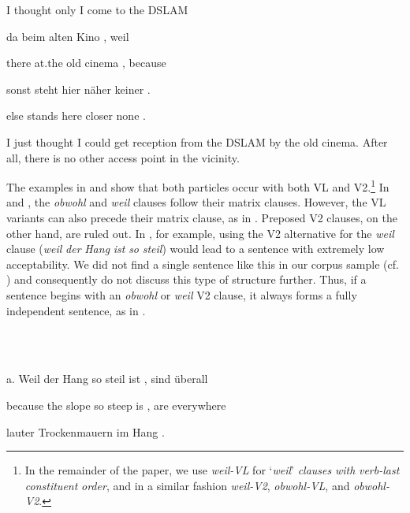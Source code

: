 I  thought  only  I  come    to  the  DSLAM



da  beim    alten    Kino    ,  weil



there  at.the    old    cinema  ,  because



sonst  steht    hier    näher    keiner  .



else  stands  here    closer  none    .



I just thought I could get reception from the DSLAM by the old cin\-ema. After all, there is no other access point in the vicinity.



The examples in  and  show that both particles occur with both VL and V2.\footnote{In the remainder of the paper, we use \textit{weil-VL} for ‘\textit{weil}’ \textit{clauses} \textit{with} \textit{verb-last} \textit{constituent} \textit{order}, and in a similar fashion \textit{weil-V2}, \textit{obwohl-VL}, and \textit{obwohl-V2}.} In  and , the \textit{obwohl} and \textit{weil} clauses follow their matrix clauses. However, the VL variants can also precede their matrix clause, as in . Preposed V2 clauses, on the other hand, are ruled out. In , for example, using the V2 alternative for the \textit{weil} clause (\textit{weil} \textit{der} \textit{Hang} \textit{ist} \textit{so} \textit{steil}) would lead to a sentence with extremely low acceptability. We did not find a single sentence like this in our corpus sample (cf. ) and consequently do not discuss this type of structure further. Thus, if a sentence begins with an \textit{obwohl} or \textit{weil} V2 clause, it always forms a fully independent sentence, as in .



\ea%
    \label{ex:key:3}
    \gll\\
        \\
    \glt
    \z

          a.  Weil    der  Hang  so  steil  ist  ,  sind  überall



because  the  slope  so  steep  is  ,  are  everywhere



lauter    Trockenmauern  im  Hang  .



